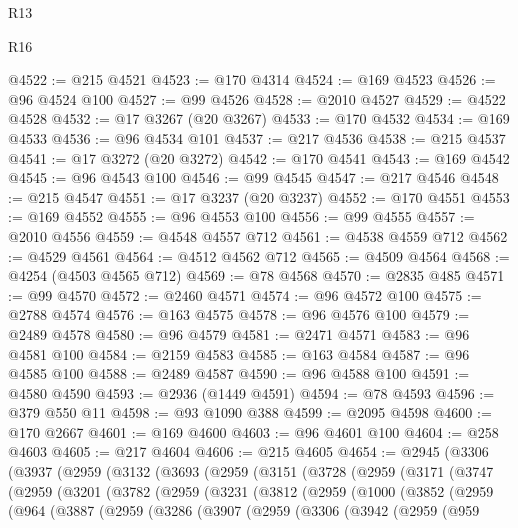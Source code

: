 \begin{lexlean}{R13}
\begin{lexlean}{R16}
\begin{coremodule}
{{{{{{{{{{{{{{{{{{{{{{{{{{{{{{{{{{{{{{{{{{{{{{{{{{{{{{{{{{{{{{{{{{{{{{{{{{{{{{{{{{{{{{{{{{{{{{{{{{{{{{{{{{{{{{{{{@4522 := @215 @4521
@4523 := @170 @4314
@4524 := @169 @4523
@4526 := @96 @4524 @100
@4527 := @99 @4526
@4528 := @2010 @4527
@4529 := @4522 @4528
@4532 := @17 @3267 (@20 @3267)
@4533 := @170 @4532
@4534 := @169 @4533
@4536 := @96 @4534 @101
@4537 := @217 @4536
@4538 := @215 @4537
@4541 := @17 @3272 (@20 @3272)
@4542 := @170 @4541
@4543 := @169 @4542
@4545 := @96 @4543 @100
@4546 := @99 @4545
@4547 := @217 @4546
@4548 := @215 @4547
@4551 := @17 @3237 (@20 @3237)
@4552 := @170 @4551
@4553 := @169 @4552
@4555 := @96 @4553 @100
@4556 := @99 @4555
@4557 := @2010 @4556
@4559 := @4548 @4557 @712
@4561 := @4538 @4559 @712
@4562 := @4529 @4561
@4564 := @4512 @4562 @712
@4565 := @4509 @4564
@4568 := @4254 (@4503 @4565 @712)
@4569 := @78 @4568
@4570 := @2835 @485
@4571 := @99 @4570
@4572 := @2460 @4571
@4574 := @96 @4572 @100
@4575 := @2788 @4574
@4576 := @163 @4575
@4578 := @96 @4576 @100
@4579 := @2489 @4578
@4580 := @96 @4579
@4581 := @2471 @4571
@4583 := @96 @4581 @100
@4584 := @2159 @4583
@4585 := @163 @4584
@4587 := @96 @4585 @100
@4588 := @2489 @4587
@4590 := @96 @4588 @100
@4591 := @4580 @4590
@4593 := @2936 (@1449 @4591)
@4594 := @78 @4593
@4596 := @379 @550 @11
@4598 := @93 @1090 @388
@4599 := @2095 @4598
@4600 := @170 @2667
@4601 := @169 @4600
@4603 := @96 @4601 @100
@4604 := @258 @4603
@4605 := @217 @4604
@4606 := @215 @4605
@4654 := @2945
    (@3306
      (@3937
        (@2959
          (@3132
            (@3693
              (@2959
                (@3151
                  (@3728
                    (@2959
                      (@3171
                        (@3747
                          (@2959
                            (@3201
                              (@3782
                                (@2959
                                  (@3231
                                    (@3812
                                      (@2959
                                        (@1000
                                          (@3852
                                            (@2959
                                              (@964
                                                (@3887
                                                  (@2959
                                                    (@3286
                                                      (@3907
                                                        (@2959
                                                          (@3306
                                                            (@3942
                                                              (@2959
                                                                (@959
}}}}}}}}}}}}}}}}}}}}}}}}}}}}}}}}}}}}}}}}}}}}}}}}}}}}}}}}}}}}}}}}}}}}}}}}}}}}}}}}}}}}}}}}}}}}}}}}}}}}}}}}}}}}}}}}}
\end{coremodule}
\end{lexlean}
\end{lexlean}
